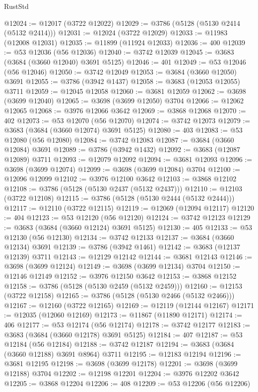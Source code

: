 \begin{lexlean}{RustStd}
\begin{coremodule}
@12024 := @12017 (@3722 @12022)
@12029 := @3786 (@5128 (@5130 @2414 (@5132 @2414)))
@12031 := @12024 (@3722 @12029)
@12033 := @11983 (@12008 @12031)
@12035 := @11899 (@11924 @12033)
@12036 := 400
@12039 := @53 @12036 (@56 @12036)
@12040 := @3742 @12039
@12045 := @3683 (@3684 (@3660 @12040) @3691 @5125)
@12046 := 401
@12049 := @53 @12046 (@56 @12046)
@12050 := @3742 @12049
@12053 := @3684 (@3660 @12050) @3691
@12055 := @3786 (@3942 @1437)
@12058 := @3683 (@12053 @12055) @3711
@12059 := @12045 @12058
@12060 := @3681 @12059
@12062 := @3698 (@3699 @12040)
@12065 := @3698 (@3699 @12050) @3704
@12066 := @12062 @12065
@12068 := @3976 @12066 @3642
@12069 := @3868 @12068
@12070 := 402
@12073 := @53 @12070 (@56 @12070)
@12074 := @3742 @12073
@12079 := @3683 (@3684 (@3660 @12074) @3691 @5125)
@12080 := 403
@12083 := @53 @12080 (@56 @12080)
@12084 := @3742 @12083
@12087 := @3684 (@3660 @12084) @3691
@12089 := @3786 (@3942 @1432)
@12092 := @3683 (@12087 @12089) @3711
@12093 := @12079 @12092
@12094 := @3681 @12093
@12096 := @3698 (@3699 @12074)
@12099 := @3698 (@3699 @12084) @3704
@12100 := @12096 @12099
@12102 := @3976 @12100 @3642
@12103 := @3868 @12102
@12108 := @3786 (@5128 (@5130 @2437 (@5132 @2437)))
@12110 := @12103 (@3722 @12108)
@12115 := @3786 (@5128 (@5130 @2444 (@5132 @2444)))
@12117 := @12110 (@3722 @12115)
@12119 := @12069 (@12094 @12117)
@12120 := 404
@12123 := @53 @12120 (@56 @12120)
@12124 := @3742 @12123
@12129 := @3683 (@3684 (@3660 @12124) @3691 @5125)
@12130 := 405
@12133 := @53 @12130 (@56 @12130)
@12134 := @3742 @12133
@12137 := @3684 (@3660 @12134) @3691
@12139 := @3786 (@3942 @1461)
@12142 := @3683 (@12137 @12139) @3711
@12143 := @12129 @12142
@12144 := @3681 @12143
@12146 := @3698 (@3699 @12124)
@12149 := @3698 (@3699 @12134) @3704
@12150 := @12146 @12149
@12152 := @3976 @12150 @3642
@12153 := @3868 @12152
@12158 := @3786 (@5128 (@5130 @2459 (@5132 @2459)))
@12160 := @12153 (@3722 @12158)
@12165 := @3786 (@5128 (@5130 @2466 (@5132 @2466)))
@12167 := @12160 (@3722 @12165)
@12169 := @12119 (@12144 @12167)
@12171 := @12035 (@12060 @12169)
@12173 := @11867 (@11890 @12171)
@12174 := 406
@12177 := @53 @12174 (@56 @12174)
@12178 := @3742 @12177
@12183 := @3683 (@3684 (@3660 @12178) @3691 @5125)
@12184 := 407
@12187 := @53 @12184 (@56 @12184)
@12188 := @3742 @12187
@12194 := @3683 (@3684 (@3660 @12188) @3691 @8964) @3711
@12195 := @12183 @12194
@12196 := @3681 @12195
@12198 := @3698 (@3699 @12178)
@12201 := @3698 (@3699 @12188) @3704
@12202 := @12198 @12201
@12204 := @3976 @12202 @3642
@12205 := @3868 @12204
@12206 := 408
@12209 := @53 @12206 (@56 @12206)

\end{coremodule}
\end{lexlean}

